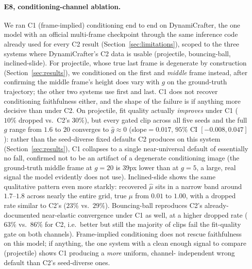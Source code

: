 \paragraph{E8, conditioning-channel ablation.}
We ran C1 (frame-implied) conditioning end to end on DynamiCrafter, the one
model with an official multi-frame checkpoint through the same inference
code already used for every C2 result (Section~\ref{sec:limitations}),
scoped to the three systems where DynamiCrafter's C2 data is usable
(projectile, bouncing-ball, inclined-slide). For projectile, whose true
last frame is degenerate by construction (Section~\ref{sec:results}), we
conditioned on the first and \emph{middle} frame instead, after confirming
the middle frame's height does vary with $g$ on the ground-truth
trajectory; the other two systems use first and last. C1 does not recover
conditioning faithfulness either, and the shape of the failure is if
anything more decisive than under C2. On projectile, fit quality actually
\emph{improves} under C1 ($10\%$ dropped vs.\ C2's $30\%$), but every
gated clip across all five seeds and the full $g$ range from $1.6$ to $20$
converges to $\hat g\approx 0$ (slope$=0.017$, $95\%$ CI
$[-0.008,0.047]$): rather than the seed-diverse fixed defaults C2 produces
on this system (Section~\ref{sec:results}), C1 collapses to a single
near-universal default of essentially no fall, confirmed not to be an
artifact of a degenerate conditioning image (the ground-truth middle frame
at $g=20$ is $39$px lower than at $g=5$, a large, real signal the model
evidently does not use). Inclined-slide shows the same qualitative pattern
even more starkly: recovered $\hat\mu$ sits in a narrow band around
$1.7$--$1.8$ across nearly the entire grid, true $\mu$ from $0.01$ to
$1.00$, with a dropped rate similar to C2's ($23\%$ vs.\ $29\%$).
Bouncing-ball reproduces C2's already-documented near-elastic convergence
under C1 as well, at a higher dropped rate ($63\%$ vs.\ $86\%$ for C2,
i.e.\ better but still the majority of clips fail the fit-quality gate on
both channels). Frame-implied conditioning does not rescue faithfulness on
this model; if anything, the one system with a clean enough signal to
compare (projectile) shows C1 producing a \emph{more} uniform, channel-
independent wrong default than C2's seed-diverse ones.

